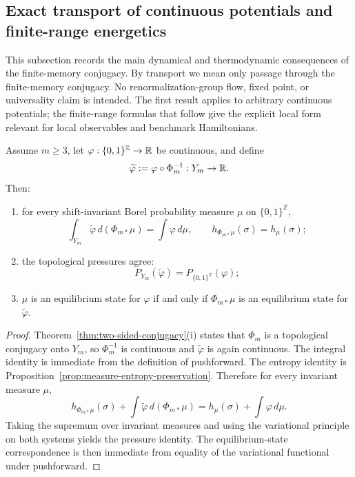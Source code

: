 \subsection{Exact transport of continuous potentials and finite-range energetics}\label{sec:measurement:renorm}

This subsection records the main dynamical and thermodynamic consequences of the finite-memory conjugacy. By transport we mean only passage through the finite-memory conjugacy. No renormalization-group flow, fixed point, or universality claim is intended. The first result applies to arbitrary continuous potentials; the finite-range formulas that follow give the explicit local form relevant for local observables and benchmark Hamiltonians.

\begin{theorem}\label{thm:continuous-potentials}
Assume $m\ge 3$, let $\varphi:\{0,1\}^{\mathbb Z}\to\mathbb{R}$ be continuous, and define
\[
\widetilde\varphi:=\varphi\circ \Phi_m^{-1}:Y_m\to\mathbb{R}.
\]
Then:
\begin{enumerate}[label=(\roman*),leftmargin=*,itemsep=2pt]
  \item for every shift-invariant Borel probability measure $\mu$ on $\{0,1\}^{\mathbb Z}$,
  \[
  \int_{Y_m}\widetilde\varphi\,d(\Phi_{m*}\mu)=\int \varphi\,d\mu,
  \qquad
  h_{\Phi_{m*}\mu}(\sigma)=h_\mu(\sigma);
  \]
  \item the topological pressures agree:
  \[
  P_{Y_m}(\widetilde\varphi)=P_{\{0,1\}^{\mathbb Z}}(\varphi);
  \]
  \item $\mu$ is an equilibrium state for $\varphi$ if and only if $\Phi_{m*}\mu$ is an equilibrium state for $\widetilde\varphi$.
\end{enumerate}
\end{theorem}

\begin{proof}
Theorem~\ref{thm:two-sided-conjugacy}(i) states that $\Phi_m$ is a topological conjugacy onto $Y_m$, so $\Phi_m^{-1}$ is continuous and $\widetilde\varphi$ is again continuous. The integral identity is immediate from the definition of pushforward. The entropy identity is Proposition~\ref{prop:measure-entropy-preservation}. Therefore for every invariant measure $\mu$,
\[
h_{\Phi_{m*}\mu}(\sigma)+\int \widetilde\varphi\,d(\Phi_{m*}\mu)
=
h_\mu(\sigma)+\int \varphi\,d\mu.
\]
Taking the supremum over invariant measures and using the variational principle on both systems yields the pressure identity. The equilibrium-state correspondence is then immediate from equality of the variational functional under pushforward.
\end{proof}

